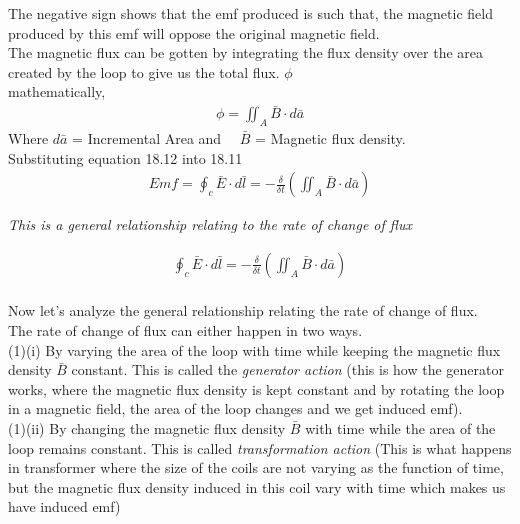 	
	The negative sign shows that the emf produced is such that, the magnetic field produced by this emf will oppose the original magnetic field. \\
	
	
	The magnetic flux can be gotten by integrating the flux density over the area created by the loop to give us the total flux. $\phi$ \\ 
	mathematically,\\
	\begin{align}
	\phi = \iint_A\bar{B} \cdot d\bar{a}
	\end{align}
	Where $d\bar{a}$ = Incremental Area and $\quad \bar{B}$ = Magnetic flux density.\\
	Substituting equation 18.12 into 18.11 \\
	\begin{align*}
	\boxed{Emf = \oint_c\bar{E}\cdot d\bar{l} = -\frac{\delta}{\delta t} (\iint_A\bar{B}\cdot d\bar{a})}
	\end{align*}
	
	\begin{flushleft}
		\emph{This is a general relationship relating to the rate of change of flux}	
	\end{flushleft}
	
	\begin{align}
	\boxed{\oint_c\bar{E}\cdot d\bar{l} = -\frac{\delta}{\delta t} (\iint_A\bar{B}\cdot d\bar{a})}
	\end{align} \\
	
	Now let's analyze the general relationship relating the rate of change of flux.\\
	The rate of change of flux can either happen in two ways.\\
	
	(1)(i) By varying the area of the loop with time while keeping the magnetic flux density $\bar{B}$ constant. This is called the \emph{generator action} (this is how the generator works, where the magnetic flux density is kept constant and by rotating the loop in a magnetic field, the area of the loop changes and we get induced emf).\\
	
	(1)(ii) By changing the magnetic flux density $\bar{B}$ with time while the area of the loop remains constant. This is called \emph{transformation action} (This is what happens in transformer where the size of the coils are not varying as the function of time, but the magnetic flux density induced in this coil vary with time which makes us have induced emf)\\
	
